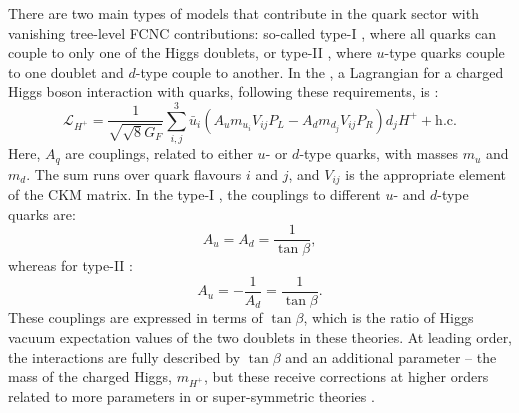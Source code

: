 There are two main types of \TwoHDM models that contribute in the quark sector with vanishing tree-level FCNC contributions:
so-called type-I \TwoHDM, where all quarks can couple to only one of the Higgs doublets, or
type-II \TwoHDM, where $u$-type quarks couple to one doublet and $d$-type couple to another.
In the \SM, a Lagrangian for a charged Higgs boson interaction with quarks, following these requirements, is \cite{Hermann:2012fc}:
\begin{equation}
    \mathcal{L}_{H^+} = \frac{1}{\sqrt{\sqrt8G_F}} \sum_{i,j}^3 \bar{u}_i (A_u m_{u_i}V_{ij}P_L - A_d m_{d_j}V_{ij}P_R)d_jH^+ + \mathrm{h.c}.
\end{equation}
Here, $A_q$ are couplings, related to either $u$- or $d$-type quarks, with masses $m_u$ and $m_d$.
The sum runs over quark flavours $i$ and $j$, and $V_{ij}$ is the appropriate element of the CKM matrix.
In the type-I \TwoHDM, the couplings to different $u$- and $d$-type quarks are:
\begin{equation}\label{eq:type1_hdm_couplings}
A_u = A_d = \frac{1}{\tan\beta},
\end{equation}
whereas for type-II \TwoHDM:
\begin{equation}\label{eq:type2_hdm_couplings}
    A_u = - \frac{1}{A_d} = \frac{1}{\tan\beta}.
\end{equation}
These couplings are expressed in terms of $\tan\beta$, which is the ratio of Higgs vacuum expectation values of the two doublets in these theories.
At leading order, the interactions are fully described by $\tan\beta$ and an additional parameter -- the mass of the charged Higgs, $m_{H^+}$, but these receive corrections at higher orders related to more parameters in \TwoHDM or super-symmetric theories \cite{Feng:1996xv}.

